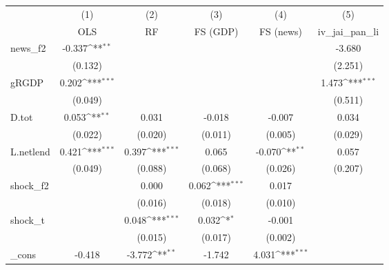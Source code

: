 {
\def\sym#1{\ifmmode^{#1}\else\(^{#1}\)\fi}
\begin{tabular}{l*{5}{c}}
\toprule
            &\multicolumn{1}{c}{(1)}&\multicolumn{1}{c}{(2)}&\multicolumn{1}{c}{(3)}&\multicolumn{1}{c}{(4)}&\multicolumn{1}{c}{(5)}\\
            &\multicolumn{1}{c}{OLS}&\multicolumn{1}{c}{RF}&\multicolumn{1}{c}{FS (GDP)}&\multicolumn{1}{c}{FS (news)}&\multicolumn{1}{c}{iv\_jai\_pan\_li}\\
\midrule
news\_f2     &      -0.337\sym{**} &                     &                     &                     &      -3.680         \\
            &     (0.132)         &                     &                     &                     &     (2.251)         \\
\addlinespace
gRGDP       &       0.202\sym{***}&                     &                     &                     &       1.473\sym{***}\\
            &     (0.049)         &                     &                     &                     &     (0.511)         \\
\addlinespace
D.tot       &       0.053\sym{**} &       0.031         &      -0.018         &      -0.007         &       0.034         \\
            &     (0.022)         &     (0.020)         &     (0.011)         &     (0.005)         &     (0.029)         \\
\addlinespace
L.netlend   &       0.421\sym{***}&       0.397\sym{***}&       0.065         &      -0.070\sym{**} &       0.057         \\
            &     (0.049)         &     (0.088)         &     (0.068)         &     (0.026)         &     (0.207)         \\
\addlinespace
shock\_f2    &                     &       0.000         &       0.062\sym{***}&       0.017         &                     \\
            &                     &     (0.016)         &     (0.018)         &     (0.010)         &                     \\
\addlinespace
shock\_t     &                     &       0.048\sym{***}&       0.032\sym{*}  &      -0.001         &                     \\
            &                     &     (0.015)         &     (0.017)         &     (0.002)         &                     \\
\addlinespace
\_cons      &      -0.418         &      -3.772\sym{**} &      -1.742         &       4.031\sym{***}&                     \\

\end{tabular}}
